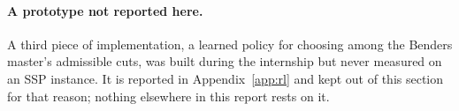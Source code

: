 \paragraph{A prototype not reported here.}
A third piece of implementation, a learned policy for choosing among the Benders
master's admissible cuts, was built during the internship but never measured on an
SSP instance. It is reported in Appendix~\ref{app:rl} and kept out of this section
for that reason; nothing elsewhere in this report rests on it.
